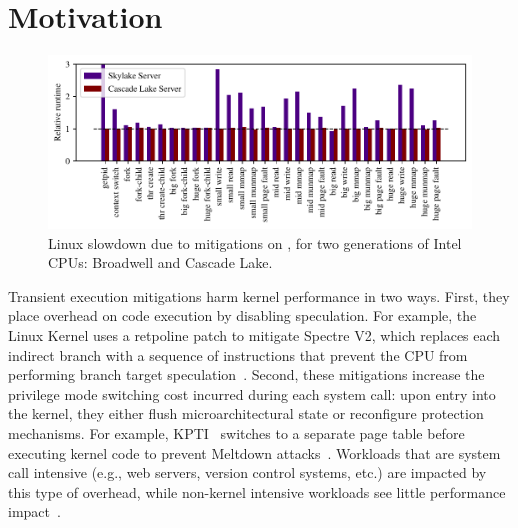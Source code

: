 \section{Motivation}
\label{s:motivation}

\begin{figure}[t]
  \begin{center}
    \includegraphics[width=\textwidth]{results/bhw2_bhw3_overhead}
  \end{center}
\vspace{-\baselineskip}
\caption{Linux slowdown due to mitigations on \bench, for two generations of Intel CPUs: Broadwell and Cascade Lake.}
\label{fig:linuxslowdown}
\end{figure}


Transient execution mitigations harm kernel performance in two
ways. First, they place overhead on code execution by disabling
speculation.  For example, the Linux Kernel uses a retpoline patch to
mitigate Spectre V2, which replaces each indirect branch with a
sequence of instructions that prevent the CPU from performing branch
target speculation~\cite{intel:retpoline}. Second, these mitigations
increase the privilege mode switching cost incurred during each system
call: upon entry into the kernel, they either flush microarchitectural
state or reconfigure protection mechanisms.  For example,
KPTI~\cite{gruss:kaiser,linux:kpti} switches to a separate page table
before executing kernel code to prevent Meltdown
attacks~\cite{lipp:meltdown}.  Workloads
that are system call intensive (e.g., web servers, version control
systems, etc.) are impacted by this type of overhead, while non-kernel
intensive workloads see little performance impact~\cite{gruss:kaiser}.

